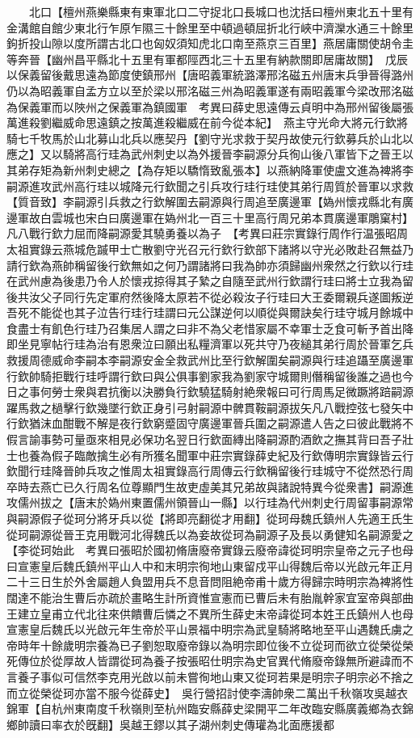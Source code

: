 　　北口【檀州燕樂縣東有東軍北口二守捉北口長城口也沈括曰檀州東北五十里有金溝館自館少東北行乍原乍隰三十餘里至中頓過頓屈折北行峽中濟灤水通三十餘里鉤折投山隙以度所謂古北口也匈奴須知虎北口南至燕京三百里】燕居庸關使胡令圭等奔晉【幽州昌平縣北十五里有軍都陘西北三十五里有納款關即居庸故關】　戊辰以保義留後戴思遠為節度使鎮邢州【唐昭義軍統潞澤邢洺磁五州唐末兵爭晉得潞州仍以為昭義軍自孟方立以至於梁以邢洺磁三州為昭義軍遂有兩昭義軍今梁改邢洺磁為保義軍而以陜州之保義軍為鎮國軍　考異曰薛史思遠傳云貞明中為邢州留後屬張萬進殺劉繼威命思遠鎮之按萬進殺繼威在前今從本紀】　燕主守光命大將元行欽將騎七千牧馬於山北募山北兵以應契丹【劉守光求救于契丹故使元行欽募兵於山北以應之】又以騎將高行珪為武州刺史以為外援晉李嗣源分兵徇山後八軍皆下之晉王以其弟存矩為新州刺史總之【為存矩以驕惰致亂張本】以燕納降軍使盧文進為裨將李嗣源進攻武州高行珪以城降元行欽聞之引兵攻行珪行珪使其弟行周質於晉軍以求救【質音致】李嗣源引兵救之行欽解圍去嗣源與行周追至廣邊軍【媯州懷戎縣北有廣邊軍故白雲城也宋白曰廣邊軍在媯州北一百三十里高行周兄弟本貫廣邊軍鵰窠村】凡八戰行欽力屈而降嗣源愛其驍勇養以為子　【考異曰莊宗實錄行周作行温張昭周太祖實錄云燕城危䠞甲士亡散劉守光召元行欽行欽部下諸將以守光必敗赴召無益乃請行欽為燕帥稱留後行欽無如之何乃謂諸將曰我為帥亦須歸幽州衆然之行欽以行珪在武州慮為後患乃令人於懷戎掠得其子縶之自隨至武州行欽謂行珪曰將士立我為留後共汝父子同行先定軍府然後降太原若不從必殺汝子行珪曰大王委爾親兵遂圖叛逆吾死不能從也其子泣告行珪行珪謂曰元公謀逆何以順從與爾訣矣行珪守城月餘城中食盡士有飢色行珪乃召集居人謂之曰非不為父老惜家屬不幸軍士乏食可斬予首出降即坐見寧帖行珪為治有恩衆泣曰願出私糧濟軍以死共守乃夜縋其弟行周於晉軍乞兵救援周德威命李嗣本李嗣源安金全救武州比至行欽解圍矣嗣源與行珪追躡至廣邊軍行欽帥騎拒戰行珪呼謂行欽曰與公俱事劉家我為劉家守城爾則僭稱留後誰之過也今日之事何勞士衆與君抗衡以決勝負行欽驍猛騎射絶衆報曰可行周馬足微蹶將踣嗣源躍馬救之檛擊行欽幾墜行欽正身引弓射嗣源中髀貫鞍嗣源拔矢凡八戰控弦七發矢中行欽猶沫血酣戰不解是夜行欽窮蹙固守廣邊軍晉兵圍之嗣源遣人告之曰彼此戰將不假言諭事勢可量亟來相見必保功名翌日行欽面縳出降嗣源酌酒飲之撫其背曰吾子壯士也養為假子臨敵擒生必有所獲名聞軍中莊宗實錄薛史紀及行欽傳明宗實錄皆云行欽聞行珪降晉帥兵攻之惟周太祖實錄高行周傳云行欽稱留後行珪城守不從然恐行周卒時去燕亡已久行周名位尊顯門生故吏虛美其兄弟故與諸說特異今從衆書】嗣源進攻儒州拔之【唐末於媯州東置儒州領晉山一縣】以行珪為代州刺史行周留事嗣源常與嗣源假子從珂分將牙兵以從【將即亮翻從才用翻】從珂母魏氏鎮州人先適王氏生從珂嗣源從晉王克用戰河北得魏氏以為妾故從珂為嗣源子及長以勇健知名嗣源愛之【李從珂始此　考異曰張昭於國初脩唐廢帝實錄云廢帝諱從珂明宗皇帝之元子也母曰宣憲皇后魏氏鎮州平山人中和末明宗徇地山東留戍平山得魏后帝以光啟元年正月二十三日生於外舍屬趙人負盟用兵不息音問阻絶帝甫十歲方得歸宗時明宗為裨將性闊達不能治生曹后亦疏於畫略生計所資惟宣憲而已曹后未有胎胤幹家宜室帝與部曲王建立皇甫立代北往來供饋曹后憐之不異所生薛史末帝諱從珂本姓王氏鎮州人也母宣憲皇后魏氏以光啟元年生帝於平山景福中明宗為武皇騎將略地至平山遇魏氏虜之帝時年十餘歲明宗養為已子劉恕取廢帝錄以為明宗即位後不立從珂而欲立從榮從榮死傳位於從厚故人皆謂從珂為養子按張昭仕明宗為史官異代脩廢帝錄無所避諱而不言養子事似可信然李克用光啟以前未嘗徇地山東又從珂若果是明宗子明宗必不捨之而立從榮從珂亦當不服今從薛史】　吳行營招討使李濤帥衆二萬出千秋嶺攻吳越衣錦軍【自杭州東南度千秋嶺則至杭州臨安縣薛史梁開平二年改臨安縣廣義鄉為衣錦鄉帥讀曰率衣於旣翻】吳越王鏐以其子湖州刺史傳瓘為北面應援都